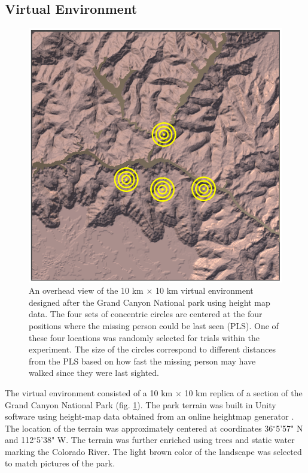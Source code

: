\documentclass{article}
\begin{document}
\subsection{Virtual Environment}
	\begin{figure}[ht!]
		\centering
		\includegraphics[width=0.99\linewidth]{images/grandCanyonTop_v2.png}
		\caption[width=0.99\linewidth]{An overhead view of the 10 km $\times$ 10 km virtual environment designed after the Grand Canyon National park using height map data. The four sets of concentric circles are centered at the four positions where the missing person could be last seen (PLS). One of these four locations was randomly selected for trials within the experiment. The size of the circles correspond to different distances from the PLS  based on how fast the missing person may have walked since they were last sighted.}
		\label{fig:grandCanyonTopView}
	\end{figure}
	
	The virtual environment consisted of a 10 km $\times$ 10 km replica of a section of the Grand Canyon National Park (fig. \ref{fig:grandCanyonTopView}). The park terrain was built in Unity software using height-map data obtained from an online heightmap generator \cite{heightmapsite}. The location of the terrain was approximately centered at coordinates 36$^{\circ}$5'57" N and 112$^{\circ}$5'38" W. The terrain was further enriched using trees and static water marking the Colorado River. The light brown color of the landscape was selected to match pictures of the park. 
	
\end{document}
